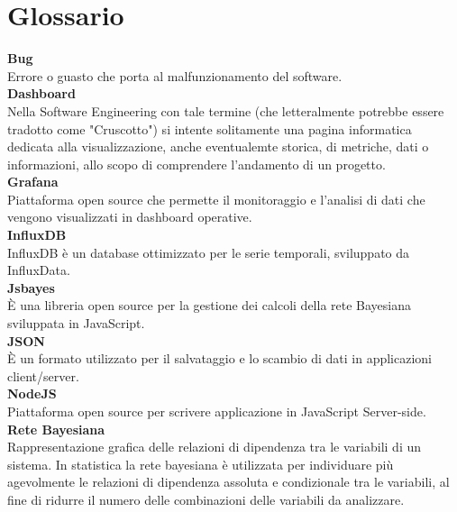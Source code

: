 \section{Glossario}\label{glox}

\textbf{Bug}\-\\
Errore o guasto che porta al malfunzionamento del software.\-\\

\textbf{Dashboard} \-\\
Nella Software Engineering con tale termine (che letteralmente potrebbe essere tradotto come "Cruscotto") si intente solitamente una pagina informatica dedicata
alla visualizzazione, anche eventualemte storica, di metriche, dati o informazioni, allo scopo di comprendere l'andamento di un progetto.\-\\

\textbf{Grafana}\-\\
Piattaforma open source che permette il monitoraggio e l'analisi di dati che vengono visualizzati in dashboard operative.\-\\

\textbf{InfluxDB}\-\\
InfluxDB è un database ottimizzato per le serie temporali, sviluppato da InfluxData.\-\\

\textbf{Jsbayes}\-\\
È una libreria open source per la gestione dei calcoli della rete Bayesiana sviluppata in JavaScript.\-\\

\textbf{JSON}\-\\
È un formato utilizzato per il salvataggio e lo scambio di dati in applicazioni client/server.\-\\

\textbf{NodeJS}\-\\
Piattaforma open source per scrivere applicazione in JavaScript Server-side.\-\\

\textbf{Rete Bayesiana} \-\\
Rappresentazione grafica delle relazioni di dipendenza tra le variabili di un sistema. In statistica la rete bayesiana è utilizzata per individuare più agevolmente le relazioni di dipendenza assoluta e condizionale tra le variabili, al fine di ridurre il numero delle combinazioni delle variabili da analizzare.\-\\


